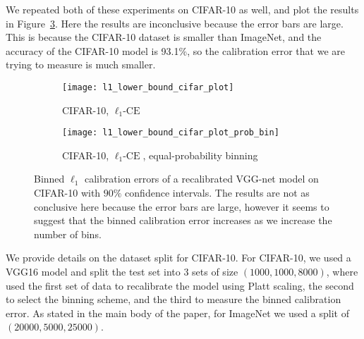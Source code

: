 We repeated both of these experiments on CIFAR-10 as well, and plot the results in Figure~\ref{fig:lower_bounds_l1_cifar}. Here the results are inconclusive because the error bars are large. This is because the CIFAR-10 dataset is smaller than ImageNet, and the accuracy of the CIFAR-10 model is 93.1\%, so the calibration error that we are trying to measure is much smaller.

\begin{figure}
     \centering
     \begin{subfigure}[b]{0.45\textwidth}
         \centering
         \texttt{[image: l1\_lower\_bound\_cifar\_plot]}
         \caption{CIFAR-10, $\ell_1\mbox{-CE}$}
         \label{fig:cifar_lower_bound_l1}
     \end{subfigure}
     \hfill
     \begin{subfigure}[b]{0.45\textwidth}
         \centering
         \texttt{[image: l1\_lower\_bound\_cifar\_plot\_prob\_bin]}
         \caption{CIFAR-10, $\ell_1\mbox{-CE}$, equal-probability binning}
         \label{fig:cifar_lower_bound_l1_prob}
     \end{subfigure}
        \caption{
        Binned $\ell_1$ calibration errors of a recalibrated VGG-net model on CIFAR-10 with $90\%$ confidence intervals. The results are not as conclusive here because the error bars are large, however it seems to suggest that the binned calibration error increases as we increase the number of bins.
        }
        \label{fig:lower_bounds_l1_cifar}
\end{figure}

We provide details on the dataset split for CIFAR-10. For CIFAR-10, we used a VGG16 model and split the test set into 3 sets of size $(1000, 1000, 8000)$, where used the first set of data to recalibrate the model using Platt scaling, the second to select the binning scheme, and the third to measure the binned calibration error. As stated in the main body of the paper, for ImageNet we used a split of $(20000, 5000, 25000)$.
